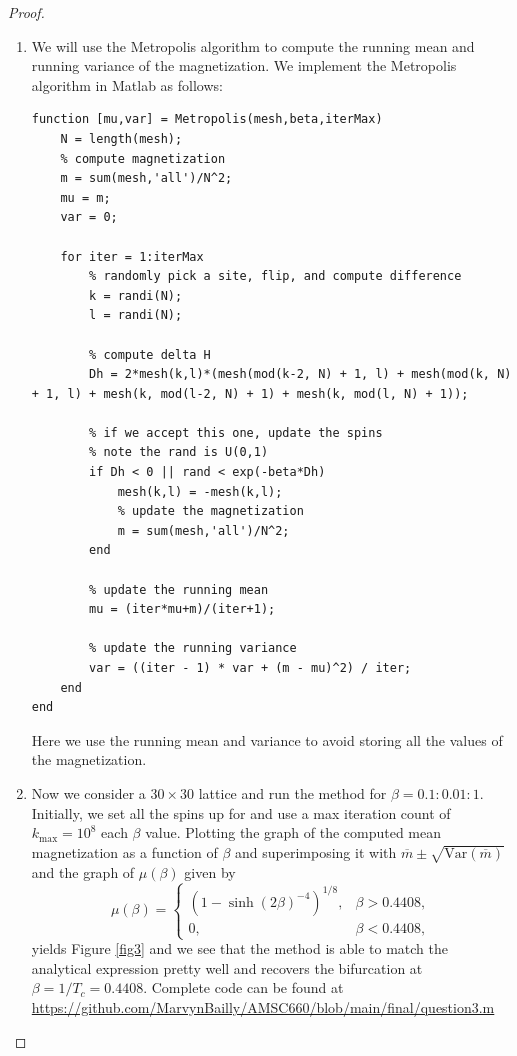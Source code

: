 \documentclass[12pt]{report}
\newenvironment{problem}{}{\newpage}
\begin{document}
\begin{problem}
\begin{proof}
\begin{enumerate}
    \item We will use the Metropolis algorithm to compute the running mean and running variance of the magnetization. We implement the Metropolis algorithm in Matlab as follows:
    \begin{lstlisting}[style=Matlab-editor]
function [mu,var] = Metropolis(mesh,beta,iterMax)
    N = length(mesh);
    % compute magnetization
    m = sum(mesh,'all')/N^2;
    mu = m;
    var = 0;

    for iter = 1:iterMax
        % randomly pick a site, flip, and compute difference
        k = randi(N);
        l = randi(N);
        
        % compute delta H
        Dh = 2*mesh(k,l)*(mesh(mod(k-2, N) + 1, l) + mesh(mod(k, N) + 1, l) + mesh(k, mod(l-2, N) + 1) + mesh(k, mod(l, N) + 1));
        
        % if we accept this one, update the spins
        % note the rand is U(0,1)
        if Dh < 0 || rand < exp(-beta*Dh)
            mesh(k,l) = -mesh(k,l);
            % update the magnetization
            m = sum(mesh,'all')/N^2;
        end
    
        % update the running mean
        mu = (iter*mu+m)/(iter+1);
            
        % update the running variance
        var = ((iter - 1) * var + (m - mu)^2) / iter;
    end
end
    \end{lstlisting}
    Here we use the running mean and variance to avoid storing all the values of the magnetization.


    \item
    Now we consider a $30\times 30$ lattice and run the method for $\beta = 0.1 : 0.01 : 1$. Initially, we set all the spins up for and use a max iteration count of $k_\text{max} = 10^8$ each $\beta$ value. Plotting the graph of the computed mean magnetization as a function of \(\beta\) and superimposing it with \(\overline{m} \pm \sqrt{\text{Var}(\overline{m})}\) and the graph of \(\mu(\beta)\) given by 
    \begin{equation*}
        \mu(\beta) = 
        \begin{cases}
        \left(1 - \sinh(2\beta)^{-4}\right)^{1/8}, & \beta > 0.4408, \\
        0, & \beta < 0.4408,
        \end{cases}     
    \end{equation*}
    yields Figure \ref{fig3} and we see that the method is able to match the analytical expression pretty well and recovers the bifurcation at $\beta = 1/T_c = 0.4408$. Complete code can be found at \url{https://github.com/MarvynBailly/AMSC660/blob/main/final/question3.m}



\end{enumerate}
\end{proof}
\end{problem}
\end{document}
